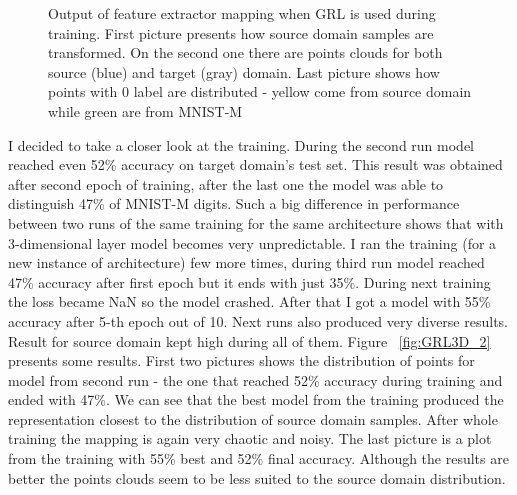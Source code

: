 \documentclass{article}
\begin{document}
\begin{figure}[htb]%
\captionsetup[subfigure]{labelformat=empty}
    \centering
    \qquad
    \qquad
    \caption{Output of feature extractor mapping when GRL is used during training. First picture presents how source domain samples are transformed. On the second one there are points clouds for both source (blue) and target (gray) domain. Last picture shows how points with 0 label are distributed - yellow come from source domain while green are from MNIST-M}%
    \label{fig:GRL3D}%
\end{figure}
I decided to take a closer look at the training. During the second run model reached even 52\% accuracy on target domain's test set. This result was obtained after second epoch of training, after the last one the model was able to distinguish 47\% of MNIST-M digits. Such a big difference in performance between two runs of the same training for the same architecture shows that with 3-dimensional layer model becomes very unpredictable. I ran the training (for a new instance of architecture) few more times, during third run model reached 47\% accuracy after first epoch but it ends with just 35\%. During next training the loss became NaN so the model crashed. After that I got a model with 55\% accuracy after 5-th epoch out of 10. Next runs also produced very diverse results. Result for source domain kept high during all of them. Figure ~\ref{fig:GRL3D_2} presents some results. First two pictures shows the distribution of points for model from second run - the one that reached 52\% accuracy during training and ended with 47\%. We can see that the best model from the training produced the representation closest to the distribution of source domain samples. After whole training the mapping is again very chaotic and noisy. The last picture is a plot from the training with 55\% best and 52\% final accuracy. Although the results are better the points clouds seem to be less suited to the source domain distribution. 
\end{document}
